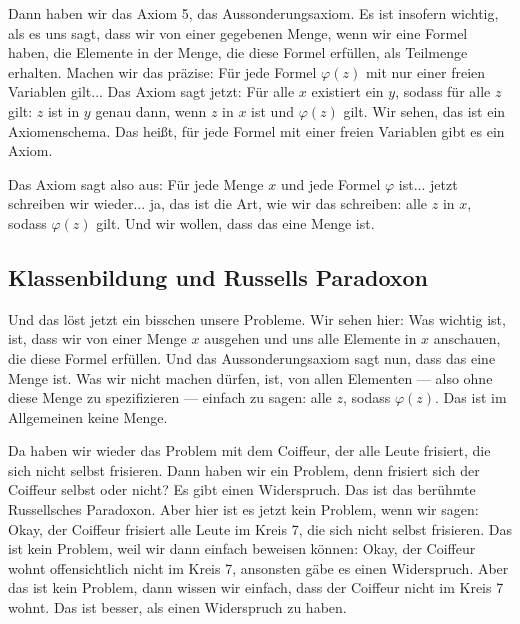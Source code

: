 \begin{spoken-clean}[00:25:03 - 00:28:41]
Dann haben wir das Axiom 5, das Aussonderungsaxiom. Es ist insofern wichtig, als es uns sagt, dass wir von einer gegebenen Menge, wenn wir eine Formel haben, die Elemente in der Menge, die diese Formel erfüllen, als Teilmenge erhalten. Machen wir das präzise: Für jede Formel $\varphi(z)$ mit nur einer freien Variablen gilt... Das Axiom sagt jetzt: Für alle $x$ existiert ein $y$, sodass für alle $z$ gilt: $z$ ist in $y$ genau dann, wenn $z$ in $x$ ist und $\varphi(z)$ gilt. Wir sehen, das ist ein Axiomenschema. Das heißt, für jede Formel mit einer freien Variablen gibt es ein Axiom.

Das Axiom sagt also aus: Für jede Menge $x$ und jede Formel $\varphi$ ist... jetzt schreiben wir wieder... ja, das ist die Art, wie wir das schreiben: alle $z$ in $x$, sodass $\varphi(z)$ gilt. Und wir wollen, dass das eine Menge ist.
\end{spoken-clean}

\subsection{Klassenbildung und Russells Paradoxon}
\begin{spoken-clean}[00:28:41 - 00:30:51]
Und das löst jetzt ein bisschen unsere Probleme. Wir sehen hier: Was wichtig ist, ist, dass wir von einer Menge $x$ ausgehen und uns alle Elemente in $x$ anschauen, die diese Formel erfüllen. Und das Aussonderungsaxiom sagt nun, dass das eine Menge ist. Was wir nicht machen dürfen, ist, von allen Elementen --- also ohne diese Menge zu spezifizieren --- einfach zu sagen: alle $z$, sodass $\varphi(z)$. Das ist im Allgemeinen keine Menge.

Da haben wir wieder das Problem mit dem Coiffeur, der alle Leute frisiert, die sich nicht selbst frisieren. Dann haben wir ein Problem, denn frisiert sich der Coiffeur selbst oder nicht? Es gibt einen Widerspruch. Das ist das berühmte Russellsches Paradoxon. Aber hier ist es jetzt kein Problem, wenn wir sagen: Okay, der Coiffeur frisiert alle Leute im Kreis 7, die sich nicht selbst frisieren. Das ist kein Problem, weil wir dann einfach beweisen können: Okay, der Coiffeur wohnt offensichtlich nicht im Kreis 7, ansonsten gäbe es einen Widerspruch. Aber das ist kein Problem, dann wissen wir einfach, dass der Coiffeur nicht im Kreis 7 wohnt. Das ist besser, als einen Widerspruch zu haben.
\end{spoken-clean}

